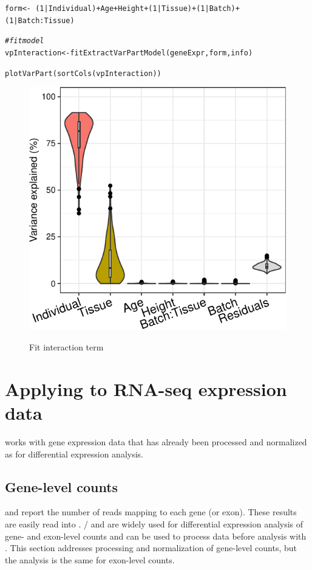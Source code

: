 \documentclass[12pt]{article}\usepackage[]{graphicx}\usepackage[]{xcolor}
\newcommand{\hlnum}[1]{\textcolor[rgb]{0.816,0.125,0.439}{#1}}%
\newcommand{\hlcom}[1]{\textcolor[rgb]{0.502,0.502,0.502}{\textit{#1}}}%
\newcommand{\hlopt}[1]{\textcolor[rgb]{0,0,0}{#1}}%
\newcommand{\hlstd}[1]{\textcolor[rgb]{0.251,0.251,0.251}{#1}}%
\newcommand{\hlkwb}[1]{\textcolor[rgb]{0,0,0}{#1}}%
\newcommand{\hlkwd}[1]{\textcolor[rgb]{0.878,0.439,0.125}{#1}}%
\newenvironment{knitrout}{}{} %
\begin{document}
\begin{knitrout}
\color{fgcolor}\begin{kframe}
\begin{alltt}
\hlstd{form} \hlkwb{<-} \hlopt{~} \hlstd{(}\hlnum{1} \hlopt{|} \hlstd{Individual)} \hlopt{+} \hlstd{Age} \hlopt{+} \hlstd{Height} \hlopt{+} \hlstd{(}\hlnum{1} \hlopt{|} \hlstd{Tissue)} \hlopt{+} \hlstd{(}\hlnum{1} \hlopt{|} \hlstd{Batch)} \hlopt{+}
  \hlstd{(}\hlnum{1} \hlopt{|} \hlstd{Batch}\hlopt{:}\hlstd{Tissue)}

\hlcom{# fit model}
\hlstd{vpInteraction} \hlkwb{<-} \hlkwd{fitExtractVarPartModel}\hlstd{(geneExpr, form, info)}

\hlkwd{plotVarPart}\hlstd{(}\hlkwd{sortCols}\hlstd{(vpInteraction))}
\end{alltt}
\end{kframe}
\end{knitrout}

\begin{figure}[h]
\centering
\caption{Fit interaction term}
\includegraphics[width=.5\textwidth]{figure/vpInteraction-1}
\label{fig:vpInteraction}
\end{figure}


\pagebreak
\section{Applying  to RNA-seq expression data}
\label{sec:normalize_RNA_Seq}

 works with gene expression data that has already been processed and normalized as for differential expression analysis.

\subsection{Gene-level counts}
 \cite{Liao2014} and  \cite{Anders2015} report the number of reads mapping to each gene (or exon).  These results are easily read into \R{}.  / and  are widely used for differential expression analysis of gene- and exon-level counts and can be used to process data before analysis with .  This section addresses processing and normalization of gene-level counts, but the analysis is the same for exon-level counts.
\end{document}
